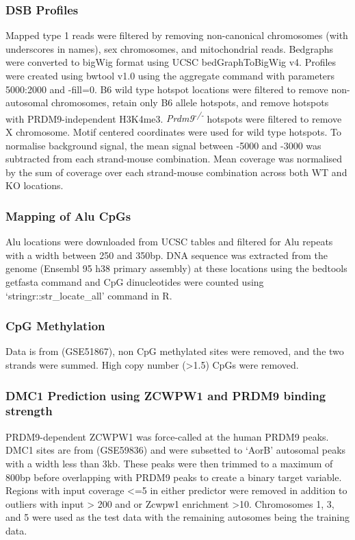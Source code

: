 \subsubsection{DSB Profiles}
Mapped type 1 reads were filtered by removing non-canonical chromosomes (with underscores in names), sex chromosomes, and mitochondrial reads.
Bedgraphs were converted to bigWig format using UCSC bedGraphToBigWig v4.
Profiles were created using bwtool v1.0 using the aggregate command with parameters 5000:2000 and -fill=0.
B6 wild type hotspot locations were filtered to remove non-autosomal chromosomes, retain only B6 allele hotspots, and remove hotspots with PRDM9-independent H3K4me3.
\textit{Prdm9\textsuperscript{-/-}} hotspots were filtered to remove X chromosome.
Motif centered coordinates were used for wild type hotspots.
To normalise background signal, the mean signal between -5000 and -3000 was subtracted from each strand-mouse combination.
Mean coverage was normalised by the sum of coverage over each strand-mouse combination across both WT and KO locations.

\subsubsection{Mapping of Alu CpGs}
Alu locations were downloaded from UCSC tables and filtered for Alu repeats with a width between 250 and 350bp.
DNA sequence was extracted from the genome (Ensembl 95 h38 primary assembly) at these locations using the bedtools getfasta command and CpG dinucleotides were counted using ‘stringr::str\_locate\_all’ command in R.

\subsubsection{CpG Methylation}
\label{sec:cpgmeth}
Data is from \parencite{Libertini2015Overexpression} (GSE51867), non CpG methylated sites were removed, and the two strands were summed.
High copy number (>1.5) CpGs were removed.

\subsubsection{DMC1 Prediction using ZCWPW1 and PRDM9 binding strength}
\label{sec:prediction}
PRDM9-dependent ZCWPW1 was force-called at the human PRDM9 peaks.
DMC1 sites are from \parencite{Pratto2014DNA} (GSE59836) and were subsetted to ‘AorB’ autosomal peaks with a width less than 3kb.
These peaks were then trimmed to a maximum of 800bp before overlapping with PRDM9 peaks to create a binary target variable.
Regions with input coverage <=5 in either predictor were removed in addition to outliers with input > 200 and or Zcwpw1 enrichment >10.
Chromosomes 1, 3, and 5 were used as the test data with the remaining autosomes being the training data.


